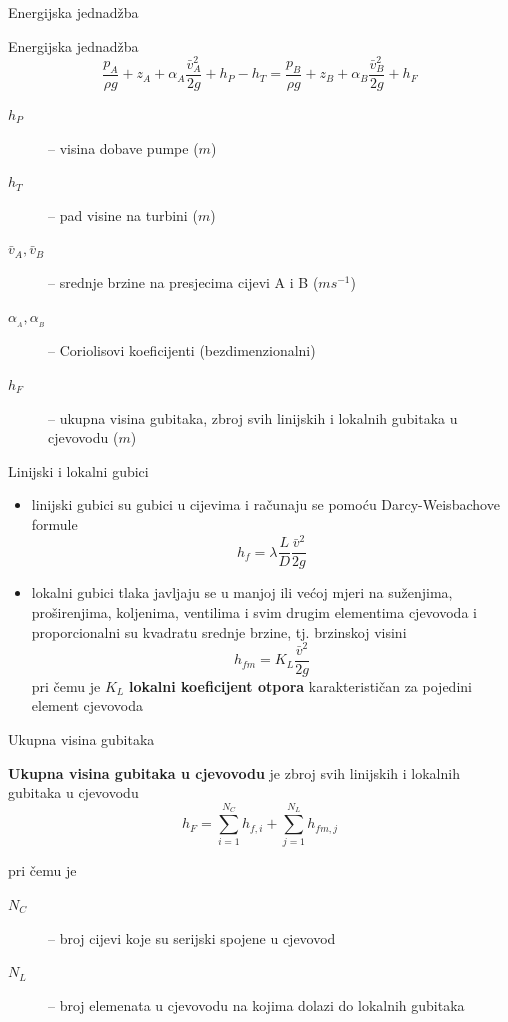 \documentclass{beamer}
\begin{document}
\begin{frame}{Energijska jednadžba}

\begin{alertblock}{Energijska jednadžba}
\[
\frac{p_{{\scriptscriptstyle A}}}{\rho g}+z_{{\scriptscriptstyle A}}+\alpha_{{\scriptscriptstyle A}}\frac{\bar{v}_{{\scriptscriptstyle A}}^{2}}{2g}+h_{P}-h_{T}=\frac{p_{{\scriptscriptstyle B}}}{\rho g}+z_{{\scriptscriptstyle B}}+\alpha_{{\scriptscriptstyle B}}\frac{\bar{v}_{{\scriptscriptstyle B}}^{2}}{2g}+h_{F}
\]
\end{alertblock}
\begin{description}
\item [{$h_{P}$}] -- visina dobave pumpe ($m$)
\item [{$h_{T}$}] -- pad visine na turbini ($m$)
\item [{$\bar{v}_{A},\bar{v}_{B}$}] -- srednje brzine na presjecima cijevi
A i B ($ms^{-1}$)
\item [{$\alpha_{_{A}},\alpha_{_{B}}$}] -- Coriolisovi koeficijenti (bezdimenzionalni)
\item [{$h_{F}$}] -- ukupna visina gubitaka, zbroj svih linijskih i lokalnih
gubitaka u cjevovodu ($m$)
\end{description}
\end{frame}

\begin{frame}{Linijski i lokalni gubici}

\begin{itemize}
\item \alert{linijski gubici} su gubici u cijevima i računaju se pomoću
Darcy-Weisbachove formule
\[
h_{f}=\lambda\frac{L}{D}\frac{\bar{v}^{2}}{2g}
\]
\item \alert{lokalni gubici} tlaka javljaju se u manjoj ili većoj mjeri
na suženjima, proširenjima, koljenima, ventilima i svim drugim elementima
cjevovoda i proporcionalni su kvadratu srednje brzine, tj. brzinskoj
visini 
\[
h_{fm}=K_{L}\frac{\bar{v}^{2}}{2g}
\]
pri čemu je $K_{L}$ \textbf{lokalni koeficijent otpora} karakterističan
za pojedini element cjevovoda
\end{itemize}
\end{frame}

\begin{frame}{Ukupna visina gubitaka}

\begin{block}{}
\textbf{Ukupna visina gubitaka u cjevovodu} je zbroj svih linijskih
i lokalnih gubitaka u cjevovodu
\[
h_{F}=\sum_{i=1}^{N_{C}}h_{f,i}+\sum_{j=1}^{N_{L}}h_{fm,j}
\]
\end{block}
pri čemu je
\begin{description}
\item [{$N_{C}$}] -- broj cijevi koje su serijski spojene u cjevovod
\item [{$N_{L}$}] -- broj elemenata u cjevovodu na kojima dolazi do lokalnih
gubitaka
\end{description}
\end{frame}
\end{document}
